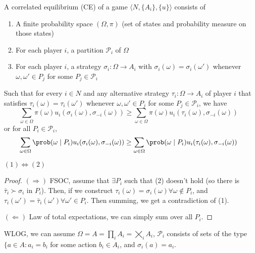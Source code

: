\documentclass[10pt]{article}
\begin{document}
\begin{definition}
	A correlated equilibrium (CE) of a game $\langle N, \{A_i\},\{u\}\rangle$ consists of \begin{enumerate}
		\item A finite probability space $(\Omega,\pi)$ (set of states and probability measure on those states) \item For each player $i$, a partition $\mathcal{P}_i$ of $\Omega$ \item For each player $i$, a strategy $\sigma_i : \Omega \to A_i$ with $\sigma_i(\omega) = \sigma_i(\omega')$ whenever $\omega,\omega' \in P_j$ for some $P_j \in \mathcal{P}_i$
	\end{enumerate}
	Such that for every $i \in N$ and any alternative strategy $\tau_i: \Omega \to A_i$ of player $i$ that satisfies $\tau_i(\omega)=\tau_i(\omega')$ whenever $\omega,\omega' \in P_j$ for some $P_j \in \mathcal{P}_i$, we have
	\begin{equation}
		\sum_{\omega \in \Omega}\pi(\omega) u_i(\sigma_i(\omega),\sigma_{-i}(\omega)) \ge \sum_{\omega \in \Omega}\pi(\omega) u_i(\tau_i(\omega),\sigma_{-i}(\omega))
	\end{equation}
	or for all $P_i \in \mathcal{P}_i$,
	\begin{equation}
		\sum_{\omega \in \Omega} \prob(\omega \mid P_i) u_i(\sigma_i(\omega),\sigma_{-i}(\omega)) \ge\sum_{\omega \in \Omega} \prob(\omega \mid P_i) u_i(\tau_i(\omega),\sigma_{-i}(\omega))
	\end{equation}
\end{definition}

\begin{proposition}
	$(1) \Longleftrightarrow (2)$
\end{proposition}
\begin{proof}
	$(\Rightarrow)$ FSOC, assume that $\exists P_i$ such that (2) doesn't hold (so there is $\bar{\tau}_i \succ \sigma_i$ in $P_i$). Then, if we construct $\tau_i(\omega) = \sigma_i(\omega) \forall \omega \not\in P_i$, and $\tau_i(\omega') = \bar{\tau}_i(\omega') \forall \omega' \in P_i$. Then summing, we get a contradiction of (1).
	
	$(\Leftarrow)$ Law of total expectations, we can simply sum over all $P_i$.
\end{proof}

\begin{proposition}
	WLOG, we can assume $\Omega = A = \prod_i A_i = \bigtimes_i A_i$, $\mathcal{P}_i$ consists of sets of the type $\{a \in A: a_i = b_i$ for some action $b_i \in A_i$, and $\sigma_i(a) = a_i$.
\end{proposition}
\end{document}
